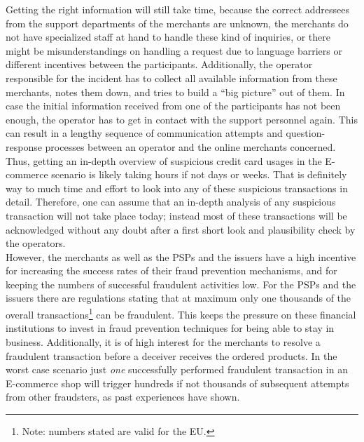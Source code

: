 Getting the right information will still take time, because the correct addressees from the support departments of the merchants are unknown, the merchants do not have specialized staff at hand to handle these kind of inquiries, or there might be misunderstandings on handling a request due to language barriers or different incentives between the participants. Additionally, the operator responsible for the incident has to collect all available information from these merchants, notes them down, and tries to build a ``big picture'' out of them. In case the initial information received from one of the participants has not been enough, the operator has to get in contact with the support personnel again. This can result in a lengthy sequence of communication attempts and question-response processes between an operator and the online merchants concerned. Thus, getting an in-depth overview of suspicious credit card usages in the \gls{E-commerce} scenario is likely taking hours if not days or weeks. That is definitely way to much time and effort to look into any of these suspicious transactions in detail. Therefore, one can assume that an in-depth analysis of any suspicious transaction will not take place today; instead most of these transactions will be acknowledged without any doubt after a first short look and plausibility check by the operators. \\

However, the merchants as well as the \gls{PSP}s and the issuers have a high incentive for increasing the success rates of their fraud prevention mechanisms, and for keeping the numbers of successful fraudulent activities low. For the \gls{PSP}s and the issuers there are regulations stating that at maximum only one thousands of the overall transactions\footnote{Note: numbers stated are valid for the EU.} can be fraudulent. This keeps the pressure on these financial institutions to invest in fraud prevention techniques for being able to stay in business. Additionally, it is of high interest for the merchants to resolve a fraudulent transaction before a deceiver receives the ordered products. In the worst case scenario just \emph{one} successfully performed fraudulent transaction in an \gls{E-commerce} shop will trigger hundreds if not thousands of subsequent attempts from other fraudsters, as past experiences have shown.


